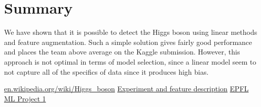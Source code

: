 \documentclass[10pt,conference,compsocconf]{IEEEtran}
\begin{document}
\section{Summary}
We have shown that it is possible to detect the Higgs boson using linear methods and feature augmentation. Such a simple solution gives fairly good performance and places the team above average on the Kaggle submission. However, this approach is not optimal in terms of model selection, since a linear model seem to not capture all of the specifics of data since it produces high bias.
\begin{thebibliography}{99}
 \href{https://en.wikipedia.org/wiki/Higgs\_boson}{en.wikipedia.org/wiki/Higgs\_boson}
 \href{http://higgsml.lal.in2p3.fr/files/2014/04/documentation\_v1.8.pdf}{Experiment and feature description}
 \href{http://kaggle.com/c/epfml-higgs}{EPFL ML Project 1}
\end{thebibliography}
\end{document}
